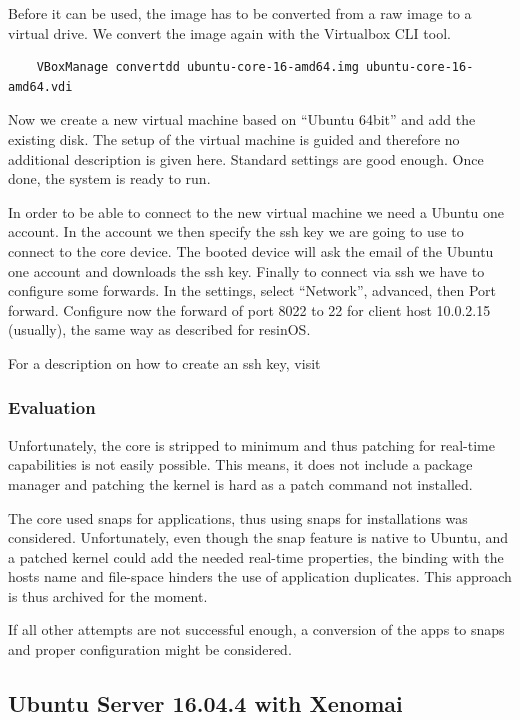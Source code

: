 \documentclass[]{scrartcl}
\begin{document}
Before it can be used, the image has to be converted from a raw image to a virtual drive. We convert the image again with the Virtualbox CLI tool.

\begin{verbatim}
	VBoxManage convertdd ubuntu-core-16-amd64.img ubuntu-core-16-amd64.vdi
\end{verbatim}

Now we create a new virtual machine based on ``Ubuntu 64bit'' and add the existing disk. The setup of the virtual machine is guided and therefore no additional description is given here. Standard settings are good enough. Once done, the system is ready to run.

In order to be able to connect to the new virtual machine we need a Ubuntu one account. In the account we then specify the ssh key we are going to use to connect to the core device. The booted device will ask the email of the Ubuntu one account and downloads the ssh key. Finally to connect via ssh we have to configure some forwards. In the settings, select ``Network'', advanced, then Port forward. Configure now the forward of port 8022 to 22 for client host 10.0.2.15 (usually), the same way as described for resinOS.

For a description on how to create an ssh key, visit \cite{atlassian01}

\subsubsection{Evaluation}

Unfortunately, the core is stripped to minimum and thus patching for real-time capabilities is not easily possible. This means, it does not include a package manager and patching the kernel is hard as a patch command not installed.

The core used snaps for applications, thus using snaps for installations was considered. Unfortunately, even though the snap feature is native to Ubuntu, and a patched kernel could add the needed real-time properties, the binding with the hosts name and file-space hinders the use of application duplicates. This approach is thus archived for the moment.

If all other attempts are not successful enough, a conversion of the apps to snaps and proper configuration might be considered.

\subsection{Ubuntu Server 16.04.4 with Xenomai}
\end{document}
